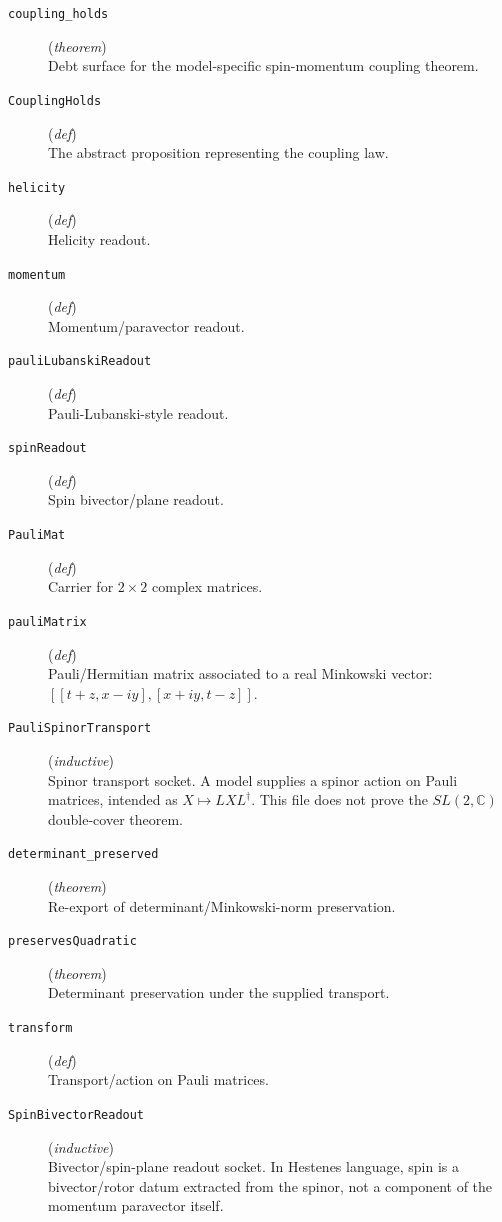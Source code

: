 \documentclass[11pt,a4paper]{article}
\begin{document}
\begin{description}
  \item[\texttt{coupling\_holds}] (\textit{theorem}) \\ Debt surface for the model-specific spin-momentum coupling theorem.
  \item[\texttt{CouplingHolds}] (\textit{def}) \\ The abstract proposition representing the coupling law.
  \item[\texttt{helicity}] (\textit{def}) \\ Helicity readout.
  \item[\texttt{momentum}] (\textit{def}) \\ Momentum/paravector readout.
  \item[\texttt{pauliLubanskiReadout}] (\textit{def}) \\ Pauli-Lubanski-style readout.
  \item[\texttt{spinReadout}] (\textit{def}) \\ Spin bivector/plane readout.
  \item[\texttt{PauliMat}] (\textit{def}) \\ Carrier for $2 \times  2$ complex matrices.
  \item[\texttt{pauliMatrix}] (\textit{def}) \\ Pauli/Hermitian matrix associated to a real Minkowski vector: 
$[[t+z, x - i y], [x + i y, t-z]]$.
  \item[\texttt{PauliSpinorTransport}] (\textit{inductive}) \\ Spinor transport socket. 
A model supplies a spinor action on Pauli matrices, intended as $X \mapsto  L X L^\dagger $. 
This file does not prove the $SL(2,\mathbb{C} )$ double-cover theorem.
  \item[\texttt{determinant\_preserved}] (\textit{theorem}) \\ Re-export of determinant/Minkowski-norm preservation.
  \item[\texttt{preservesQuadratic}] (\textit{theorem}) \\ Determinant preservation under the supplied transport.
  \item[\texttt{transform}] (\textit{def}) \\ Transport/action on Pauli matrices.
  \item[\texttt{SpinBivectorReadout}] (\textit{inductive}) \\ Bivector/spin-plane readout socket. 
In Hestenes language, spin is a bivector/rotor datum extracted from the spinor, 
not a component of the momentum paravector itself.

\end{description}
\end{document}
